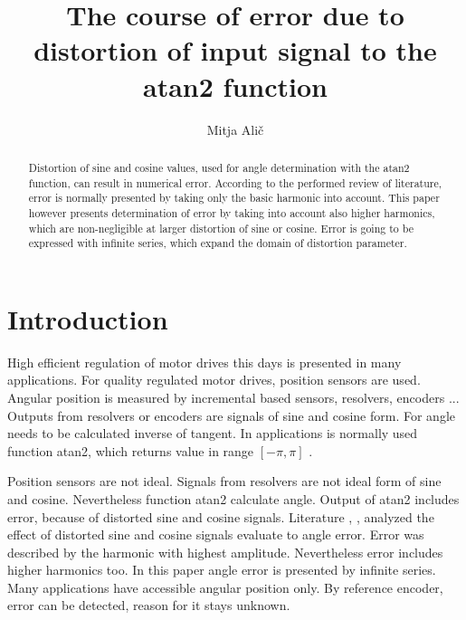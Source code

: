 \documentclass[a4paper]{article}
\begin{document}
\title{The course of error due to distortion of input signal to the atan2 function}

\author{Mitja Alič} %



\maketitle


\begin{abstract}{ }
Distortion of sine and cosine values, used for angle determination with the atan2 function, can result in numerical error. According to the performed review of literature, error is normally presented by taking only the basic harmonic into account. This paper however presents determination of error by taking into account also higher harmonics, which are non-negligible at larger distortion of sine or cosine. Error is going to be expressed with infinite series, which expand the domain of distortion parameter. 
\end{abstract}



\section{Introduction}

High efficient regulation of motor drives this days is presented in many applications. For quality regulated motor drives, position sensors are used\cite{uporaba_senzorjev}. Angular position is measured by incremental based sensors, resolvers, encoders \cite{inkrementalni}\cite{resolver}\cite{enkoder}... Outputs from resolvers or encoders are signals of sine and cosine form. For angle  needs to be calculated inverse of tangent. In applications is normally used function atan2, which returns value in range $[-\pi, \pi]$ \cite{atan}.

Position sensors are not ideal. Signals from resolvers are not ideal form of sine and cosine. Nevertheless function atan2 calculate angle. Output of atan2 includes error, because of distorted sine and cosine signals. Literature \cite{RLS1}, \cite{RLS2}, \cite{RLS3}   analyzed the effect of distorted sine and cosine signals evaluate to angle error. Error was described by the harmonic with highest amplitude. Nevertheless error includes higher harmonics too. In this paper angle error is presented by infinite series. Many applications have accessible angular position only. By reference encoder, error can be detected, reason for it stays unknown.
\end{document}
